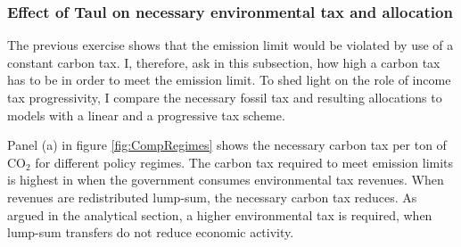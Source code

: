 \subsubsection{Effect of Taul on necessary environmental tax and allocation}

The previous exercise shows that the emission limit would be violated by use of a constant carbon tax. I, therefore, ask in this subsection, how high a carbon tax has to be in order to meet the emission limit. To shed light on the role of income tax progressivity, I compare the necessary fossil tax and resulting allocations to models with a linear  and a progressive tax scheme. 


Panel (a) in figure \ref{fig:CompRegimes} shows the necessary carbon tax per ton of CO$_2$ for different policy regimes. The carbon tax required to meet emission limits is highest in when the government consumes environmental tax revenues. When revenues are redistributed lump-sum, the necessary carbon tax reduces. As argued in the analytical section, a higher environmental tax is required, when lump-sum transfers do not reduce economic activity. 

